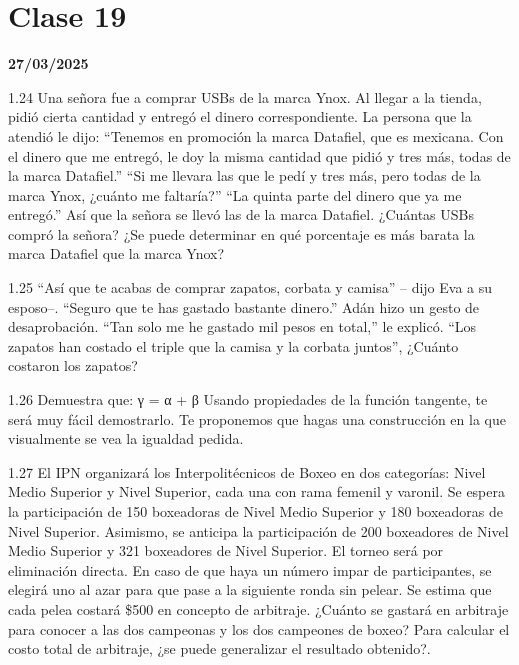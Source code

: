 \section{Clase 19}
\textbf{27/03/2025}

1.24 Una señora fue a comprar USBs de la marca Ynox. Al llegar a la tienda, pidió cierta cantidad y entregó el dinero correspondiente. La persona que la atendió le dijo: “Tenemos en promoción la marca Datafiel, que es mexicana. Con el dinero que me entregó, le doy la misma cantidad que pidió y tres más, todas de la marca Datafiel.” “Si me llevara las que le pedí y tres más, pero todas de la marca Ynox, ¿cuánto me faltaría?” “La quinta parte del dinero que ya me entregó.” Así que la señora se llevó las de la marca Datafiel. ¿Cuántas USBs compró la señora? ¿Se puede determinar en qué porcentaje es más barata la marca Datafiel que la marca Ynox?

1.25 “Así que te acabas de comprar zapatos, corbata y camisa” – dijo Eva a su esposo–. “Seguro que te has gastado bastante dinero.” Adán hizo un gesto de desaprobación. “Tan solo me he gastado mil pesos en total,” le explicó. “Los zapatos han costado el triple que la camisa y la corbata juntos”, ¿Cuánto costaron los zapatos?

1.26 Demuestra que: γ = α + β Usando propiedades de la función tangente, te será muy fácil demostrarlo. Te proponemos que hagas una construcción en la que visualmente se vea la igualdad pedida.

1.27 El IPN organizará los Interpolitécnicos de Boxeo en dos categorías: Nivel Medio Superior y Nivel Superior, cada una con rama femenil y varonil. Se espera la participación de 150 boxeadoras de Nivel Medio Superior y 180 boxeadoras de Nivel Superior. Asimismo, se anticipa la participación de 200 boxeadores de Nivel Medio Superior y 321 boxeadores de Nivel Superior. El torneo será por eliminación directa. En caso de que haya un número impar de participantes, se elegirá uno al azar para que pase a la siguiente ronda sin pelear. Se estima que cada pelea costará \$500 en concepto de arbitraje. ¿Cuánto se gastará en arbitraje para conocer a las dos campeonas y los dos campeones de boxeo? Para calcular el costo total de arbitraje, ¿se puede generalizar el resultado obtenido?.